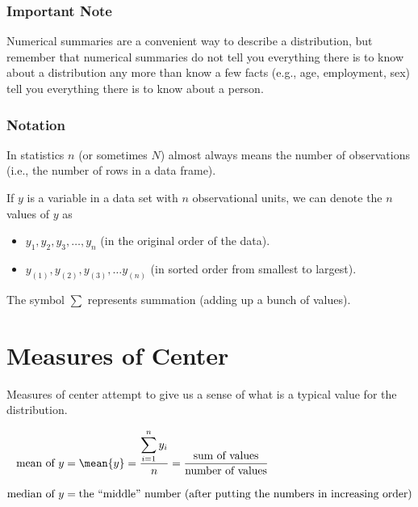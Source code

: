 \documentclass[twoside]{book}\usepackage[]{graphicx}\usepackage[]{xcolor}
\begin{document}
\subsubsection*{Important Note}
Numerical summaries are a convenient way to 
describe a distribution, but remember that numerical summaries 
do not tell you everything there is to know about a distribution any
more than know a few facts (e.g., age, employment, sex) tell you everything 
there is to know about a person.

\subsubsection*{Notation}
In statistics $n$ (or sometimes $N$) almost always means the number 
of observations (i.e., the number of rows in a data frame).

If $y$ is a variable in a data set with $n$ observational units, we 
can denote the $n$ values of $y$ as 
\begin{itemize}
\item
$y_1, y_2, y_3, \dots, y_n$ (in the original order of the data).
\item
$y_{(1)}, y_{(2)}, y_{(3)}, \dots y_{(n)}$ (in sorted order from smallest to largest).

\end{itemize}

The symbol $\displaystyle \sum$ represents summation (adding up a bunch of values).

\section{Measures of Center}
Measures of center attempt to give us a sense of what is a
typical value for the distribution.


\begin{align*}
\mbox{mean of $y$} 
&=
\mean{y}
= \frac{\displaystyle \sum_{i=1}^{n} y_i}{n}
= \frac{\mbox{sum of values}}{\mbox{number of values}}  
\\[3mm]
\mbox{median of $y$}
&=
\mbox{the ``middle'' number (after putting the numbers in increasing order)}
\end{align*}
\end{document}
